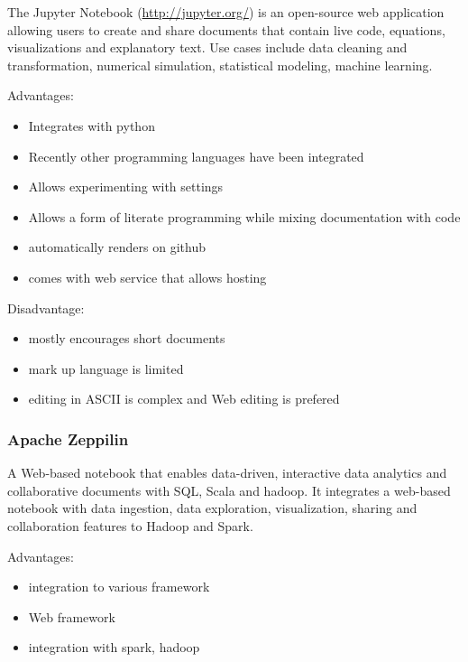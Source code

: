 The Jupyter Notebook (\url{http://jupyter.org/}) is an open-source web
application allowing users to create and share documents that contain
live code, equations, visualizations and explanatory text. Use cases
include data cleaning and transformation, numerical simulation,
statistical modeling, machine learning.

Advantages:

\begin{itemize}

\item
  Integrates with python
\item
  Recently other programming languages have been integrated
\item
  Allows experimenting with settings
\item
  Allows a form of literate programming while mixing documentation with
  code
\item
  automatically renders on github
\item
  comes with web service that allows hosting
\end{itemize}

Disadvantage:

\begin{itemize}

\item
  mostly encourages short documents
\item
  mark up language is limited
\item
  editing in ASCII is complex and Web editing is prefered
\end{itemize}

\subsubsection{Apache Zeppilin}\label{apache-zeppilin}

A Web-based notebook that enables data-driven, interactive data
analytics and collaborative documents with SQL, Scala and hadoop. It
integrates a web-based notebook with data ingestion, data exploration,
visualization, sharing and collaboration features to Hadoop and Spark.

Advantages:

\begin{itemize}

\item
  integration to various framework
\item
  Web framework
\item
  integration with spark, hadoop
\end{itemize}

